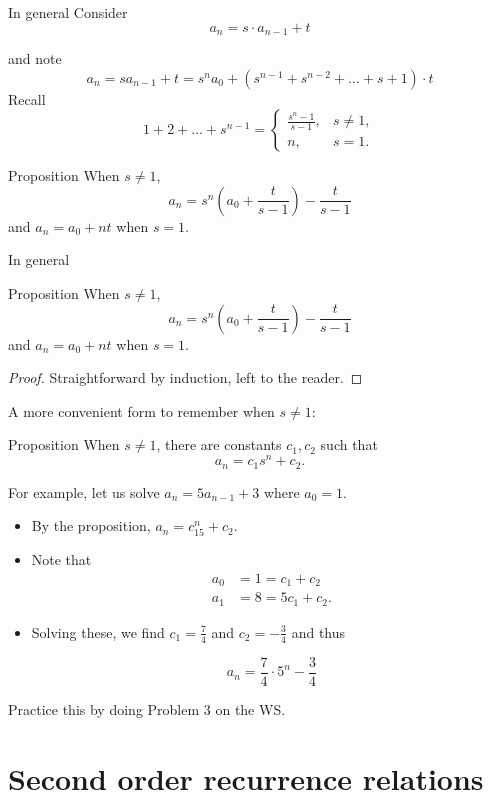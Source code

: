 \documentclass{beamer}
\def\bl[#1]#2{\begin{block}{#1}#2\end{block}}
\def\itemb{\begin{itemize}}
\def\iteme{\end{itemize}}
\begin{document}
\begin{frame}{In general}
Consider\vspace{-0.3cm}
\[
a_{n}=s\cdot a_{n-1}+t
\]\vspace{-0.6cm}

and note
\[
a_n=sa_{n-1}+t=s^na_0+(s^{n-1}+s^{n-2}+\dots+s+1)\cdot t
\]
Recall
\[
1+2+\dots+s^{n-1}=\left\{\begin{array}{cc}
\frac{s^n-1}{s-1},&s\neq 1,\\
n,&s=1.
\end{array}\right.
\]\vspace{-0.3cm}
\bl[Proposition]{
When $s\neq 1$,\vspace{-0.1cm}
\[
a_n=s^n\left(a_0+\frac{t}{s-1}\right)-\frac{t}{s-1}
\]
and $a_n=a_0+nt$ when $s=1$.}\vspace{-0.3cm}
\end{frame}

\begin{frame}{In general}
\bl[Proposition]{
When $s\neq 1$,\vspace{-0.1cm}
\[
a_n=s^n\left(a_0+\frac{t}{s-1}\right)-\frac{t}{s-1}
\]
and $a_n=a_0+nt$ when $s=1$.}\vspace{-0.3cm}
\begin{proof}Straightforward by induction, left to the reader.\end{proof}
\end{frame}

\begin{frame}
A more convenient form to remember when $s\neq 1$:
\bl[Proposition]{
When $s\neq 1$, there are constants $c_1,c_2$ such that\vspace{-0.1cm}
\[
a_n=c_1s^n+c_2.
\]}
For example, let us solve $a_n=5a_{n-1}+3$ where $a_0=1$.
\itemb
\item By the proposition, $a_n=c_15^n+c_2$.
\item Note that
\begin{align*}
a_0&=1=c_1+c_2\\
a_1&=8=5c_1+c_2.
\end{align*}
\item Solving these, we find $c_1=\frac{7}{4}$ and $c_2=-\frac{3}{4}$ and thus
\bl[]{
\[
a_n=\frac{7}{4}\cdot 5^n-\frac{3}{4}
\]}
\iteme
Practice this by doing Problem 3 on the WS.
\end{frame}

\section{Second order recurrence relations}
\end{document}
